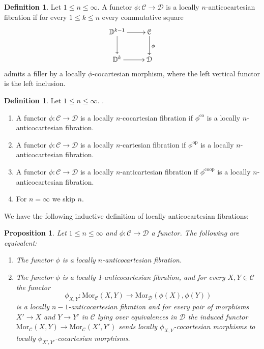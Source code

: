 \documentclass[10pt,oneside]{article}
\numberwithin{equation}{section} %
\numberwithin{figure}{section} %
\theoremstyle{plain}
\newtheorem{proposition}[theorem]{Proposition}
\theoremstyle{definition}
\newtheorem{definition}[theorem]{Definition}
\newcommand{\bD}{{\mathbb D}}
\newcommand{\mC}{{\mathcal C}}
\newcommand{\mD}{{\mathcal D}}
\newcommand{\X}{X}
\newcommand{\Y}{Y}
\newcommand{\op}{\mathrm{op}}
\newcommand{\co}{\mathrm{co}}
\newcommand{\Mor}{{\mathrm{Mor}}}
\begin{document}
\begin{definition} Let $1 \leq n \leq \infty.$
A functor $\phi: \mC \to \mD$ is a locally $n$-anticocartesian fibration if for every $1 \leq k \leq n$ 
every commutative square 
$$\begin{xy}
\xymatrix{
\bD^{k-1} \ar[d] \ar[r]
& \mC \ar[d]^\phi
\\ 
\bD^k \ar[r] & \mD
}
\end{xy}$$
admits a filler by a locally $\phi$-cocartesian morphism,
where the left vertical functor is the left inclusion.

\end{definition}

\begin{definition}Let $1 \leq n \leq \infty. $
.
\begin{enumerate}[\normalfont(1)]\setlength{\itemsep}{-2pt}

\item A functor $\phi: \mC \to \mD$ is a locally $n$-cocartesian fibration if $\phi^{\co}$ is a locally $n$-anticocartesian fibration.

\item A functor $\phi: \mC \to \mD$ is a locally $n$-cartesian fibration if $\phi^\op$ is a locally $n$-anticocartesian fibration.

\item A functor $\phi: \mC \to \mD$ is a locally $n$-anticartesian fibration if $\phi^{\co\op}$ is a locally $n$-anticocartesian fibration.

\item For $n = \infty$ we skip $n.$

\end{enumerate}
    
\end{definition}

We have the following inductive definition of locally anticocartesian fibrations:

\begin{proposition}\label{cocarto1}
Let $1 \leq n \leq \infty$ and $\phi: \mC \to \mD$ a functor.
The following are equivalent:

\begin{enumerate}[\normalfont(1)]\setlength{\itemsep}{-2pt}
\item The functor $\phi$ is a locally $n$-anticocartesian fibration.

\item The functor $\phi$ is a locally 1-anticocartesian fibration, and for every $\X,\Y \in \mC$ the functor
\[
\phi_{X,Y}: \Mor_\mC(\X,\Y) \to \Mor_\mD(\phi(\X),\phi(\Y))
\]
is a locally $n-1$-anticocartesian fibration
and for every pair of morphisms $X' \to X$ and $Y \to Y'$ in $\mC$
lying over equivalences in $\mD$ the induced functor 
$\Mor_\mC(\X,\Y) \to \Mor_\mC(X',Y')$ sends locally $\phi_{X,Y}$-cocartesian morphisms to locally $\phi_{X',Y'}$-cocartesian morphisms.
\end{enumerate}

\end{proposition}
\end{document}
